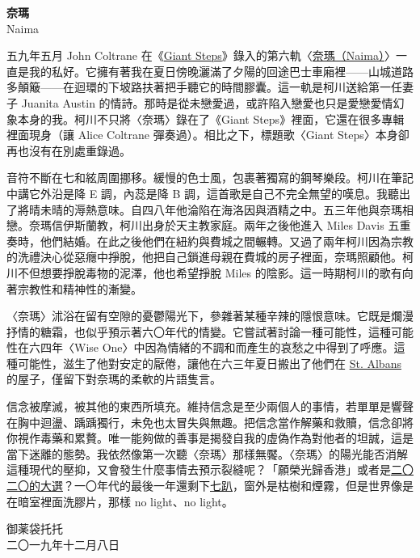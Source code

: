 \documentclass[10pt]{article}
\begin{document}
\begin{flushleft}
\textbf{奈瑪}\\
Naima\\
\end{flushleft}
\vspace{3em}

五九年五月 John Coltrane
在《\href{https://en.wikipedia.org/wiki/Giant_Steps}{Giant
Steps}》錄入的第六軌〈\href{https://en.wikipedia.org/wiki/Naima}{奈瑪（Naima）}〉一直是我的私好。它擁有著我在夏日傍晚灑滿了夕陽的回途巴士車廂裡——山城道路多顛簸——在迴環的下坡路扶著把手聽它的時間膠囊。這一軌是柯川送給第一任妻子
Juanita Austin
的情詩。那時是從未戀愛過，或許陷入戀愛也只是愛戀愛情幻象本身的我。柯川不只將〈奈瑪〉錄在了《Giant
Steps》裡面，它還在很多專輯裡面現身（讓 Alice Coltrane
彈奏過）。相比之下，標題歌〈Giant Steps〉本身卻再也沒有在別處重錄過。

音符不斷在七和絃周圍挪移。緩慢的色士風，包裹著獨寫的鋼琴樂段。柯川在筆記中講它外沿是降
E 調，內蕊是降 B
調，這首歌是自己不完全無望的嘆息。我聽出了將晴未晴的溽熱意味。自四八年他淪陷在海洛因與酒精之中。五三年他與奈瑪相戀。奈瑪信伊斯蘭教，柯川出身於天主教家庭。兩年之後他進入
Miles Davis
五重奏時，他們結婚。在此之後他們在紐約與費城之間輾轉。又過了兩年柯川因為宗教的洗禮決心從惡癮中掙脫，他把自己鎖進母親在費城的房子裡面，奈瑪照顧他。柯川不但想要掙脫毒物的泥澤，他也希望掙脫
Miles 的陰影。這一時期柯川的歌有向著宗教性和精神性的漸變。

〈奈瑪〉沭浴在留有空隙的憂鬱陽光下，參雜著某種辛辣的隱恨意味。它既是爛漫抒情的糖霜，也似乎預示著六〇年代的情變。它嘗試著討論一種可能性，這種可能性在六四年〈Wise
One〉中因為情緒的不調和而產生的哀愁之中得到了呼應。這種可能性，滋生了他對安定的厭倦，讓他在六三年夏日搬出了他們在
\href{https://en.wikipedia.org/wiki/St._Albans,_Queens}{St. Albans}
的屋子，僅留下對奈瑪的柔軟的片語隻言。

信念被摩滅，被其他的東西所填充。維持信念是至少兩個人的事情，若單單是響聲在胸中迴盪、踽踽獨行，未免也太冒失與無趣。把信念當作解藥和救贖，信念卻將你視作毒藥和累贅。唯一能夠做的善事是揭發自我的虛偽作為對他者的坦誠，這是當下迷離的態勢。我依然像第一次聽〈奈瑪〉那樣無饜。〈奈瑪〉的陽光能否消解這種現代的壓抑，又會發生什麼事情去預示裂縫呢？「願榮光歸香港」或者是\href{https://twitter.com/ElectionDay_bot}{二〇二〇的大選}？一〇年代的最後一年還剩下\href{https://twitter.com/year_progress/status/1202905524326608896}{七趴}，窗外是枯樹和煙霧，但是世界像是在暗室裡面洗膠片，那樣
no light、no light。

\vspace{3em}
\begin{flushleft}
\small{御薬袋托托\\
二〇一九年十二月八日}
\end{flushleft}
\end{document}
